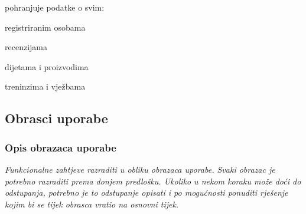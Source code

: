 \begin{packed_enum}
				\begin{packed_enum}
					
					\item pohranjuje podatke o svim: 
					
					\begin{packed_enum}
						
						\item registriranim osobama
						\item recenzijama
						\item dijetama i proizvodima
						\item treninzima i vježbama
					
					\end{packed_enum}	
				
				\end{packed_enum}
			
			\end{packed_enum}
			
			\eject 
			
			
				
			\subsection{Obrasci uporabe}
				
				\subsubsection{Opis obrazaca uporabe}
					\textit{Funkcionalne zahtjeve razraditi u obliku obrazaca uporabe. Svaki obrazac je potrebno razraditi prema donjem predlošku. Ukoliko u nekom koraku može doći do odstupanja, potrebno je to odstupanje opisati i po mogućnosti ponuditi rješenje kojim bi se tijek obrasca vratio na osnovni tijek.}\\
					

